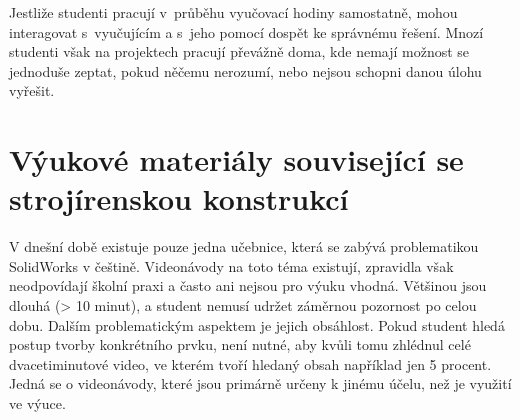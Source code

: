     Jestliže studenti pracují v~průběhu vyučovací hodiny samostatně, mohou interagovat s~vyučujícím a s~jeho pomocí dospět ke správnému řešení.
    Mnozí studenti však na projektech pracují převážně doma, kde nemají možnost se jednoduše zeptat, pokud něčemu nerozumí, nebo nejsou schopni danou úlohu vyřešit.

\section{Výukové materiály související se strojírenskou konstrukcí}
    V dnešní době existuje pouze jedna učebnice, která se zabývá problematikou SolidWorks v češtině.
    Videonávody na toto téma existují, zpravidla však neodpovídají školní praxi a často ani nejsou pro výuku vhodná.
    Většinou jsou dlouhá (> 10 minut), a student nemusí udržet záměrnou pozornost po celou dobu.
    Dalším problematickým aspektem je jejich obsáhlost.
    Pokud student hledá postup tvorby konkrétního prvku, není nutné, aby kvůli tomu zhlédnul celé dvacetiminutové video, ve kterém tvoří hledaný obsah například jen 5 procent. 
    Jedná se o videonávody, které jsou primárně určeny k jinému účelu, než je využití ve výuce. 
